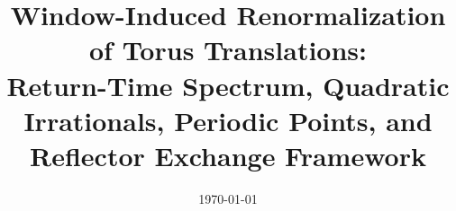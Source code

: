 \documentclass[11pt,letterpaper]{article}
\title{Window-Induced Renormalization of Torus Translations: \\\large Return-Time Spectrum, Quadratic Irrationals, Periodic Points, and Reflector Exchange Framework}
\author{}
\date{\today}
\begin{document}
\maketitle













\FloatBarrier
\appendix





\FloatBarrier

\end{document}
